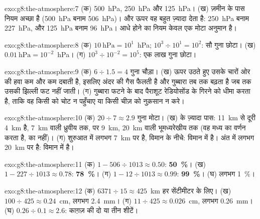 \begin{solution}{exo:g8:the-atmosphere:7}
(क) \qty{500}{hPa}, \qty{250}{hPa} और \qty{125}{hPa}। (ख) ज़मीन के पास नियम
अच्छा है (\qty{500}{hPa} बनाम \qty{506}{hPa})। और ऊपर वह बहुत ज़्यादा देता है:
\qty{250}{hPa} बनाम \qty{227}{hPa}, और \qty{125}{hPa} बनाम \qty{96}{hPa}।
आधे होने का नियम केवल एक मोटा
अनुमान है।
\end{solution}

\begin{solution}{exo:g8:the-atmosphere:8}
(क) $10~\text{hPa} = 10^1$~hPa; $10^3 \div 10^1 = 10^2$: सौ गुना छोटा।
(ख) $0.01~\text{hPa} = 10^{-2}$~hPa। (ग) $10^3 \div 10^{-2} =
10^5$: एक लाख
गुना छोटा।
\end{solution}

\begin{solution}{exo:g8:the-atmosphere:9}
(क) $6 \div 1.5 = 4$ गुना चौड़ा। (ख) ऊपर उठते हुए उसके चारों ओर की हवा कम और कम
दबाती है, इसलिए अंदर की गैस फैलती है और गुब्बारा तब तक बढ़ता है जब तक उसकी झिल्ली फट
नहीं जाती। (ग) गुब्बारा फटने के बाद पैराशूट रेडियोसोंड के गिरने को धीमा करता है, ताकि
वह किसी को चोट न पहुँचाए या किसी चीज़ को नुक़सान न
करे।
\end{solution}

\begin{solution}{exo:g8:the-atmosphere:10}
(क) $20 \div 7 \approx 2.9$ गुना मोटा। (ख)  के ज़्यादा पास: \qty{11}{km} से
दूरी \qty{4}{km} है, \qty{7}{km} वाली ध्रुवीय  तक, पर \qty{9}{km},
\qty{20}{km} वाली भूमध्यरेखीय  तक (वह मध्य  का वर्णन करता है,
 का नहीं)। (ग) शुरुआत में  लगभग \qty{7}{km} पर है, विमान के
नीचे: विमान  में है। अंत में  लगभग \qty{20}{km} पर है: विमान
 में है।
\end{solution}

\begin{solution}{exo:g8:the-atmosphere:11}
(क) $1 - 506 \div 1013 \approx 0.50$: \textbf{50~\%}। (ख) $1 - 227 \div
1013 \approx 0.78$: \textbf{78~\%}। (ग) $1 - 12 \div 1013 \approx 0.99$:
\textbf{99~\%}। (घ) लगभग 1~\%।
\end{solution}

\begin{solution}{exo:g8:the-atmosphere:12}
(क) $6371 \div 15 \approx 425$~km हर सेंटीमीटर के लिए। (ख) $100 \div 425
\approx 0.24$~cm, लगभग \qty{2.4}{mm}। (ग) $11 \div 425 \approx
0.026$~cm,
लगभग \qty{0.26}{mm}। (घ) $0.26 \div 0.1 \approx 2.6$: काग़ज़ की दो या तीन
शीटें।
\end{solution}

